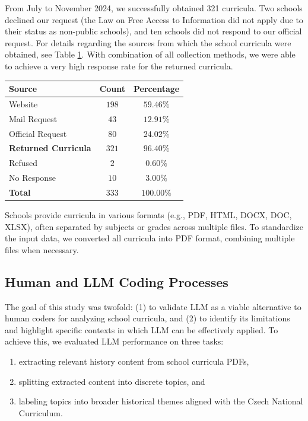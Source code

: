 \documentclass[]{interact}
\theoremstyle{plain}%
\theoremstyle{definition}
\theoremstyle{remark}
\begin{document}
From July to November 2024, we successfully obtained 321 curricula. Two schools declined our request (the Law on Free Access to Information did not apply due to their status as non-public schools), and ten schools did not respond to our official request. For details regarding the sources from which the school curricula were obtained, see Table \ref{curricula-sources}. With combination of all collection methods, we were able to achieve a very high response rate for the returned curricula.

\begin{table}
{\begin{tabular}{lcc} \toprule
Source & Count & Percentage \\ \midrule
Website & $198$ & $59.46\%$ \\
Mail Request & $43$ & $12.91\%$ \\
Official Request & $80$ & 24.02\% \\ \midrule
\textbf{Returned Curricula} & $321$ & $96.40\%$ \\ \midrule
Refused & $2$ & $0.60\%$ \\ 
No Response & $10$ & $3.00\%$ \\ \midrule
\textbf{Total} & $333$ & $100.00\%$ \\ \midrule
\end{tabular}}
\label{curricula-sources}
\end{table}

Schools provide curricula in various formats (e.g., PDF, HTML, DOCX, DOC, XLSX), often separated by subjects or grades across multiple files. To standardize the input data, we converted all curricula into PDF format, combining multiple files when necessary.


\subsection{Human and LLM Coding Processes}

The goal of this study was twofold: (1) to validate LLM as a viable alternative to human coders for analyzing school curricula, and (2) to identify its limitations and highlight specific contexts in which LLM can be effectively applied. To achieve this, we evaluated LLM performance on three tasks:  
\begin{enumerate}
    \item extracting relevant history content from school curricula PDFs,  
    \item splitting extracted content into discrete topics, and  
    \item labeling topics into broader historical themes aligned with the Czech National Curriculum.  
\end{enumerate}
\end{document}
